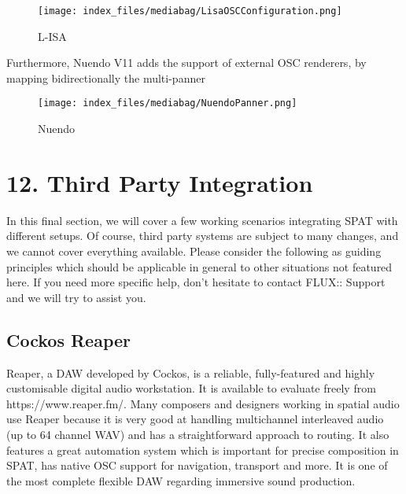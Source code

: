 \documentclass[
  letterpaper,
  DIV=11,
  numbers=noendperiod]{scrreport}
\begin{document}
\begin{figure}

{\centering \texttt{[image: index\_files/mediabag/LisaOSCConfiguration.png]}

}

\caption{L-ISA}

\end{figure}

Furthermore, Nuendo V11 adds the support of external OSC renderers, by
mapping bidirectionally the multi-panner

\begin{figure}

{\centering \texttt{[image: index\_files/mediabag/NuendoPanner.png]}

}

\caption{Nuendo}

\end{figure}

\part{12. Third Party Integration}

In this final section, we will cover a few working scenarios integrating
SPAT with different setups. Of course, third party systems are subject
to many changes, and we cannot cover everything available. Please
consider the following as guiding principles which should be applicable
in general to other situations not featured here. If you need more
specific help, don't hesitate to contact FLUX:: Support and we will try
to assist you.

\hypertarget{cockos-reaper}{%
\chapter{Cockos Reaper}\label{cockos-reaper}}

Reaper, a DAW developed by Cockos, is a reliable, fully-featured and
highly customisable digital audio workstation. It is available to
evaluate freely from https://www.reaper.fm/. Many composers and
designers working in spatial audio use Reaper because it is very good at
handling multichannel interleaved audio (up to 64 channel WAV) and has a
straightforward approach to routing. It also features a great automation
system which is important for precise composition in SPAT, has native
OSC support for navigation, transport and more. It is one of the most
complete flexible DAW regarding immersive sound production.
\end{document}
